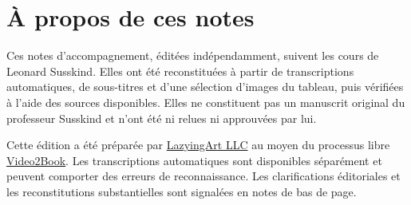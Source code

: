 \documentclass[11pt,oneside]{book}
\begin{document}
\frontmatter
\hypersetup{pageanchor=false}

\hypersetup{pageanchor=true}

\clearpage
\chapter*{À propos de ces notes}
Ces notes d’accompagnement, éditées indépendamment, suivent les cours de Leonard Susskind. Elles ont été reconstituées à partir de transcriptions automatiques, de sous-titres et d’une sélection d’images du tableau, puis vérifiées à l’aide des sources disponibles. Elles ne constituent pas un manuscrit original du professeur Susskind et n’ont été ni relues ni approuvées par lui.

Cette édition a été préparée par \href{https://lazying.art}{LazyingArt LLC} au moyen du processus libre \href{https://github.com/lachlanchen/Video2Book}{Video2Book}. Les transcriptions automatiques sont disponibles séparément et peuvent comporter des erreurs de reconnaissance. Les clarifications éditoriales et les reconstitutions substantielles sont signalées en notes de bas de page.
\clearpage
\tableofcontents
\mainmatter










\end{document}
